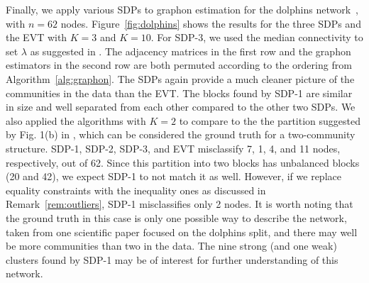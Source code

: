 Finally, we apply various SDPs to graphon estimation for the dolphins network~\cite{Lusseau&Newman2004}, with
$n=62$ nodes. Figure~\ref{fig:dolphins} shows the results for the three SDPs
and the EVT with $K= 3$ and $K =10$.   For SDP-3, we used the median connectivity to set $\lambda$
as suggested in \cite{Cai2014}.   The adjacency matrices in the first row and the graphon estimators
in the second row are both permuted according to the ordering from
Algorithm~\ref{alg:graphon}.   The SDPs again provide a much cleaner
picture of the communities in the data than the EVT.  The blocks found by SDP-1 are similar in size and well separated from each other compared to the other two SDPs. %
We also applied the algorithms with $K=2$ to compare to the the partition suggested
by Fig. 1(b) in \cite{Lusseau&Newman2004}, which can be considered the ground truth for a two-community structure.  SDP-1, SDP-2, SDP-3, and EVT
misclassify  7, 1, 4, and 11 nodes, respectively, out of 62.  Since this 
partition into two blocks has 
unbalanced blocks (20 and 42), we expect SDP-1 to not match it as well.  
However,  if we replace equality constraints with
the inequality ones as discussed in Remark~\ref{rem:outliers}, SDP-1 misclassifies only 2
nodes. It is worth noting that the ground truth in this case is only one possible way to describe the network, taken from one scientific paper focused on the dolphins split, and there may well be more communities than two in the data.  The nine strong (and one weak) clusters found by SDP-1 may be of interest for further understanding of this network.



